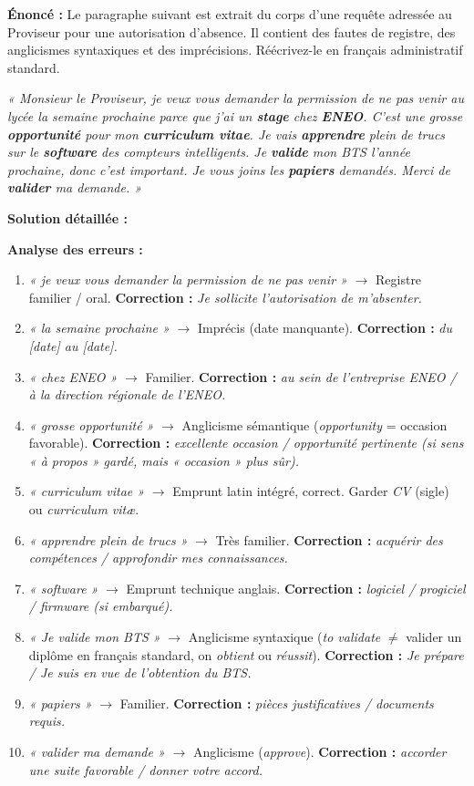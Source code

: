 \documentclass[11pt]{article}
\begin{document}
\begin{exoresolu}
\textbf{Énoncé :} Le paragraphe suivant est extrait du corps d'une requête adressée au Proviseur pour une autorisation d'absence. Il contient des fautes de registre, des anglicismes syntaxiques et des imprécisions. Réécrivez-le en français administratif standard.

\emph{« Monsieur le Proviseur, je veux vous demander la permission de ne pas venir au lycée la semaine prochaine parce que j'ai un \textbf{stage} chez \textbf{ENEO}. C'est une grosse \textbf{opportunité} pour mon \textbf{curriculum vitae}. Je vais \textbf{apprendre} plein de trucs sur le \textbf{software} des compteurs intelligents. Je \textbf{valide} mon BTS l'année prochaine, donc c'est important. Je vous joins les \textbf{papiers} demandés. Merci de \textbf{valider} ma demande. »}

\tcblower
\textbf{Solution détaillée :}

\textbf{Analyse des erreurs :}
\begin{enumerate}
    \item \emph{« je veux vous demander la permission de ne pas venir »} $\rightarrow$ Registre familier / oral. \textbf{Correction :} \emph{Je sollicite l'autorisation de m'absenter.}
    \item \emph{« la semaine prochaine »} $\rightarrow$ Imprécis (date manquante). \textbf{Correction :} \emph{du [date] au [date].}
    \item \emph{« chez ENEO »} $\rightarrow$ Familier. \textbf{Correction :} \emph{au sein de l'entreprise ENEO / à la direction régionale de l'ENEO.}
    \item \emph{« grosse opportunité »} $\rightarrow$ Anglicisme sémantique (\emph{opportunity} = occasion favorable). \textbf{Correction :} \emph{excellente occasion / opportunité pertinente (si sens « à propos » gardé, mais « occasion » plus sûr).}
    \item \emph{« curriculum vitae »} $\rightarrow$ Emprunt latin intégré, correct. Garder \emph{CV} (sigle) ou \emph{curriculum vitæ}.
    \item \emph{« apprendre plein de trucs »} $\rightarrow$ Très familier. \textbf{Correction :} \emph{acquérir des compétences / approfondir mes connaissances.}
    \item \emph{« software »} $\rightarrow$ Emprunt technique anglais. \textbf{Correction :} \emph{logiciel / progiciel / firmware (si embarqué).}
    \item \emph{« Je valide mon BTS »} $\rightarrow$ Anglicisme syntaxique (\emph{to validate} $\neq$ valider un diplôme en français standard, on \emph{obtient} ou \emph{réussit}). \textbf{Correction :} \emph{Je prépare / Je suis en vue de l'obtention du BTS.}
    \item \emph{« papiers »} $\rightarrow$ Familier. \textbf{Correction :} \emph{pièces justificatives / documents requis.}
    \item \emph{« valider ma demande »} $\rightarrow$ Anglicisme (\emph{approve}). \textbf{Correction :} \emph{accorder une suite favorable / donner votre accord.}
\end{enumerate}


\end{exoresolu}
\end{document}

